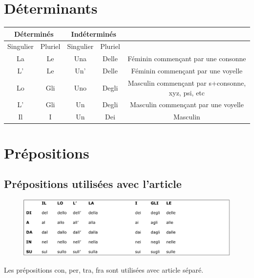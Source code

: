 \documentclass[12pt, openany]{report}
\begin{document}
\section{Déterminants}
\begin{center}
    \begin{tabular}{c|c|c|c|c}
        \multicolumn{2}{c|}{Déterminés} & \multicolumn{2}{c|}{Indéterminés} & \\ \hline
        Singulier & Pluriel & Singulier & Pluriel & \\
        La & Le & Una & Delle & Féminin commençant par une consonne \\ 
        L' & Le & Un' & Delle & Féminin commençant par une voyelle \\ 
        Lo & Gli & Uno & Degli & Masculin commençant par s+consonne, xyz, psi, etc\\ 
        L' & Gli & Un & Degli & Masculin commençant par une voyelle \\ 
        Il & I & Un & Dei & Masculin \\ 
    \end{tabular}    
\end{center}
\section{Prépositions}
\subsection{Prépositions utilisées avec l'article}
\begin{figure}[H]
    \centering
    \includegraphics[width = \textwidth]{img/prep.png}
\end{figure}
Les prépositions con, per, tra, fra sont utilisées avec article séparé. 
\end{document}
